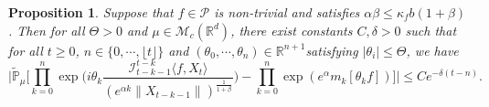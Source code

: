\documentclass[12pt,a4paper]{amsart}
\theoremstyle{plain}
\newtheorem{prop}[thm]{Proposition}
\theoremstyle{definition}
\numberwithin{equation}{section}
\begin{document}
\begin{prop}\label{cor: indepedent of the limit zeta for critical and small}
   Suppose that $f\in \mathcal{P}$ is non-trivial and satisfies $\alpha\beta\leq\kappa_fb(1+\beta)$.
    Then for all $\Theta >0$ and $\mu\in \mathcal M_c(\mathbb R^d)$, there exist constants $C,\delta>0$ such that for all $t\geq 0$, $n \in \{0, \cdots, \lfloor t \rfloor\}$ and $(\theta_0, \cdots, \theta_n)\in \mathbb R^{n+1}$satisfying $|\theta_i|\leq \Theta$, we have
\begin{equation}
\label{32corollary}
    \Big|\mathbb{\tilde{P}}_{\mu}\Big[\prod_{k=0}^n\exp\Big(i\theta_k \frac {\mathcal I_{t-k-1}^{t-k}\langle f ,X_t\rangle}{(e^{\alpha k}\|X_{t-k-1}\|)^\frac{1}{1+\beta}}\Big)-\prod_{k=0}^n\exp(e^{\alpha}m_k[\theta_k f])\Big]\Big|\leq C e^{-\delta(t-n)}.
\end{equation}
\end{prop}
\end{document}
